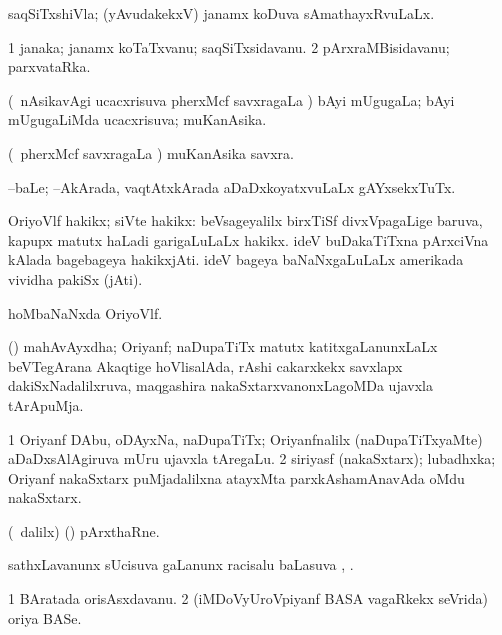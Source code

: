 \bentry
{}
\gl{\gu}
\bmng
saqSiTxshiVla; (yAvudakekxV) janamx koDuva sAmathayxRvuLaLx. 
\emng
\eentry

\bentry
{}
\gl{\nA}
\bmng
\bnum
\num{1} janaka; janamx koTaTxvanu; saqSiTxsidavanu. 
\num{2} pArxraMBisidavanu; parxvataRka. 
\enum
\emng
\eentry

\bentry
{}
\gl{\gu}
\bmng
(\kanmu\ nAsikavAgi ucacxrisuva pherxMcf savxragaLa \vi) bAyi mUgugaLa; bAyi mUgugaLiMda ucacxrisuva; muKanAsika. 
\emng
\eentry

\bentry
{}
\gl{\nA}
\bmng
(\kanmu\ pherxMcf savxragaLa \vi) muKanAsika savxra. 
\emng
\eentry

\bentry
{}
\gl{\nA}
\bmng
\eng{$\bigcirc$}--baLe; \eng{$\bigcirc$}--AkArada, vaqtAtxkArada aDaDxkoyatxvuLaLx gAYxsekxTuTx. 
\emng
\eentry

\bentry
{}
\gl{\nA}
\bmng
OriyoVlf hakikx; siVte hakikx: 
\banum
{} beVsageyalilx birxTiSf divxVpagaLige baruva, kapupx matutx haLadi garigaLuLaLx hakikx. 
 ideV buDakaTiTxna pArxciVna kAlada bagebageya hakikxjAti. 
 ideV bageya baNaNxgaLuLaLx amerikada vividha pakiSx (jAti). 
\eanum
\emng

\noindent
\gl{\pagu}
\bmng
{} hoMbaNaNxda OriyoVlf. 
\emng
\eentry

\bentry
{}
\gl{\nA}
\bmng
(\Kavi) mahAvAyxdha; Oriyanf; naDupaTiTx matutx katitxgaLanunxLaLx beVTegArana Akaqtige hoVlisalAda, rAshi cakarxkekx savxlapx dakiSxNadalilxruva, maqgashira nakaSxtarxvanonxLagoMDa ujavxla tArApuMja. 
\emng

\noindent
\gl{\pagu}
\bmng
\bnum
\num{1}  Oriyanf DAbu, oDAyxNa, naDupaTiTx; Oriyanfnalilx (naDupaTiTxyaMte) aDaDxsAlAgiruva mUru ujavxla tAregaLu. 
\num{2}  siriyasf (nakaSxtarx); lubadhxka; Oriyanf nakaSxtarx puMjadalilxna atayxMta parxkAshamAnavAda oMdu nakaSxtarx. 
\enum
\emng
\eentry

\bentry
{}
\gl{\nA}
\bmng
(\sA\ \bava dalilx) (\pArxparx) pArxthaRne. 
\emng
\eentry

\bentry
{}
\gl{\uparx}
\bmng
sathxLavanunx sUcisuva \nA gaLanunx racisalu baLasuva \uparx, . 
\emng
\eentry

\bentry
{}
\gl{\nA}
\bmng
\bnum
\num{1} BAratada orisAsxdavanu. 
\num{2} (iMDoVyUroVpiyanf BASA vagaRkekx seVrida) oriya BASe. 
\enum
\emng
\eentry

